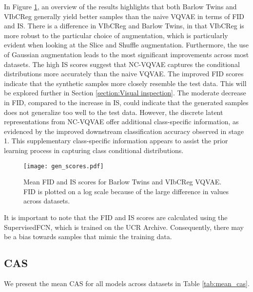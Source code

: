 \documentclass[../../thesis.tex]{subfiles}
\begin{document}
In Figure \ref{fig:mean_gen_scores}, an overview of the results highlights that both Barlow Twins and VIbCReg generally yield better samples than the naive VQVAE in terms of FID and IS. There is a difference in VIbCReg and Barlow Twins, in that VIbCReg is more robust to the particular choice of augmentation, which is particularly evident when looking at the Slice and Shuffle augmentation. Furthermore, the use of Gaussian augmentation leads to the most significant improvements across most datasets. The high IS scores suggest that NC-VQVAE captures the conditional distributions more accurately than the naive VQVAE. The improved FID scores indicate that the synthetic samples more closely resemble the test data. This will be explored further in Section \ref{section:Visual inspection}. The moderate decrease in FID, compared to the increase in IS, could indicate that the generated samples does not generalize too well to the test data. However, the discrete latent representations from NC-VQVAE offer additional class-specific information, as evidenced by the improved downstream classification accuracy observed in stage 1. This supplementary class-specific information appears to assist the prior learning process in capturing class conditional distributions.

\begin{figure}[h]
    \texttt{[image: gen\_scores.pdf]}
    \centering  
    \caption{Mean FID and IS scores for Barlow Twins and VIbCReg VQVAE. FID is plotted on a log scale because of the large difference in values across datasets.}
    \label{fig:mean_gen_scores}
\end{figure}

It is important to note that the FID and IS scores are calculated using the SupervisedFCN, which is trained on the UCR Archive. Consequently, there may be a bias towards samples that mimic the training data.

\subsection{CAS}

We present the mean CAS for all models across datasets in Table \ref{tab:mean_cas}.
\end{document}
